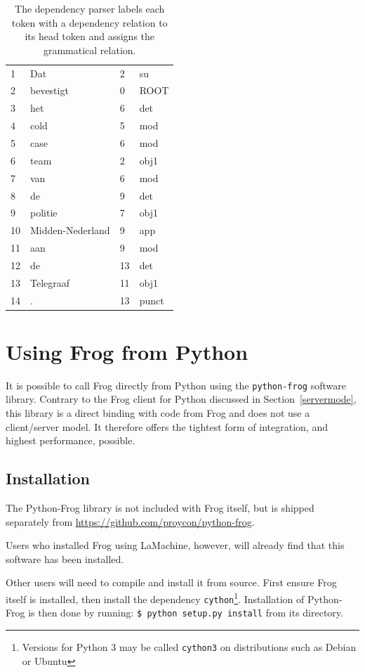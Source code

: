 \documentclass{book}
\begin{document}
\begin{table}[h]
\begin{tabular}{llll}
1&Dat&2&su\\
2&bevestigt&0&ROOT\\
3&het&6&det\\
4&cold&5&mod\\
5&case&6&mod\\
6&team&2&obj1\\
7&van&6&mod\\
8&de&9&det\\
9&politie&7&obj1\\
10&Midden-Nederland&9&app\\
11&aan&9&mod\\
12&de&13&det\\
13&Telegraaf&11&obj1\\
14&.&13&punct\\
\end{tabular}
\caption{\label{ex-dep} The dependency parser labels each token with a dependency relation to its head token and assigns the grammatical relation.}
\end{table}

\section{Using Frog from Python}
\label{pythonfrog}

It is possible to call Frog directly from Python using the \texttt{python-frog}
software library. Contrary to the Frog client for Python discussed in
Section~\ref{servermode}, this library is a direct binding with code from
Frog and does not use a client/server model. It therefore offers the tightest
form of integration, and highest performance, possible.

\subsection{Installation}

The Python-Frog library is not included with Frog itself, but is shipped
separately from \url{https://github.com/proycon/python-frog}.

Users who installed Frog using LaMachine, however, will already find that this software
has been installed.

Other users will need to compile and install it from
source. First ensure Frog itself is installed, then install the dependency
\texttt{cython}\footnote{Versions for Python 3 may be called \texttt{cython3}
on distributions such as Debian or Ubuntu}. Installation of Python-Frog is then
done by running: \texttt{\$ python setup.py install} from its directory.
\end{document}
